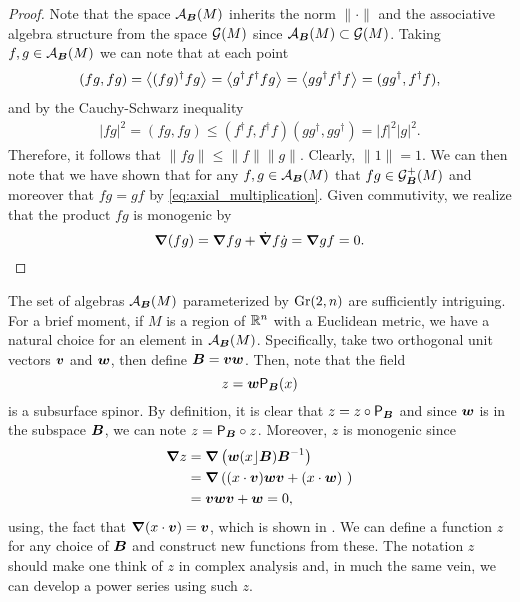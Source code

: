 \begin{proof}
Note that the space $\mathcal{A}_{\boldsymbol{B}}(M)$ inherits the norm $\|\cdot \|$ and the associative algebra structure from the space $\mathcal{G}(M)$ since $\mathcal{A}_{\boldsymbol{B}}(M)\subset \mathcal{G}(M)$. Taking $f,g \in \mathcal{A}_{\boldsymbol{B}}(M)$ we can note that at each point
\begin{align}
(fg,fg) = \left\langle(fg)^\dagger fg\right\rangle_{}=\left\langle g^\dagger f^\dagger f g\right\rangle_{} = \left\langle gg^\dagger f^\dagger f\right\rangle_{} = (gg^\dagger, f^\dagger f),
\end{align}
and by the Cauchy-Schwarz inequality 
\begin{align}
|fg|^2 = (fg,fg) \leq (f^\dagger f, f^\dagger f) (gg^\dagger,gg^\dagger) = |f|^2 |g|^2.
\end{align}
Therefore, it follows that $\|fg\|\leq \|f\|\|g\|$. Clearly, $\|1\|=1$. We can then note that we have shown that for any $f,g \in \mathcal{A}_{\boldsymbol{B}}(M)$ that $fg \in \mathcal{G}_{\boldsymbol{B}}^+(M)$ and moreover that $fg=gf$ by \cref{eq:axial_multiplication}. Given commutivity, we realize that the product $fg$ is monogenic by
\begin{equation}
\boldsymbol{\nabla}(fg) = \boldsymbol{\nabla} fg+\dot{\boldsymbol{\nabla}}f \dot{g} = \boldsymbol{\nabla} g f = 0.
\end{equation}
\end{proof}
The set of algebras $\mathcal{A}_{\boldsymbol{B}}(M)$ parameterized by $\operatorname{Gr}(2,n)$ are sufficiently intriguing. For a brief moment, if $M$ is a region of $\mathbb{R}^n$ with a Euclidean metric, we have a natural choice for an element in $\mathcal{A}_{\boldsymbol{B}}(M)$. Specifically, take two orthogonal unit vectors $\boldsymbol{v}$ and $\boldsymbol{w}$, then define $\boldsymbol{B} = \boldsymbol{v}\boldsymbol{w}$. Then, note that the field
\begin{equation}
\label{eq:z}
z = \boldsymbol{w} \mathsf{P}_{\boldsymbol{B}}(x)
\end{equation}
is a subsurface spinor. By definition, it is clear that $z = z \circ \mathsf{P}_{\boldsymbol{B}}$ and since $\boldsymbol{w}$ is in the subspace $\boldsymbol{B}$, we can note $z = \mathsf{P}_{\boldsymbol{B}} \circ z$. Moreover, $z$ is monogenic since
\begin{align}
\boldsymbol{\nabla} z &= \boldsymbol{\nabla}\left(\boldsymbol{w} (x\rfloor \boldsymbol{B})\boldsymbol{B}^{-1}\right)\\
    &= \boldsymbol{\nabla} \left( (x\cdot \boldsymbol{v})\boldsymbol{w}\boldsymbol{v}+(x\cdot \boldsymbol{w}) \ \right)\\
    &= \boldsymbol{v}\boldsymbol{w}\boldsymbol{v}+\boldsymbol{w} = 0,
\end{align}
using, the fact that $\boldsymbol{\nabla} (x \cdot \boldsymbol{v})=\boldsymbol{v}$, which is shown in \cite[eq. (6.5)]{doran_geometric_2003}. We can define a function $z$ for any choice of $\boldsymbol{B}$ and construct new functions from these. The notation $z$ should make one think of $z$ in complex analysis and, in much the same vein, we can develop a power series using such $z$.


